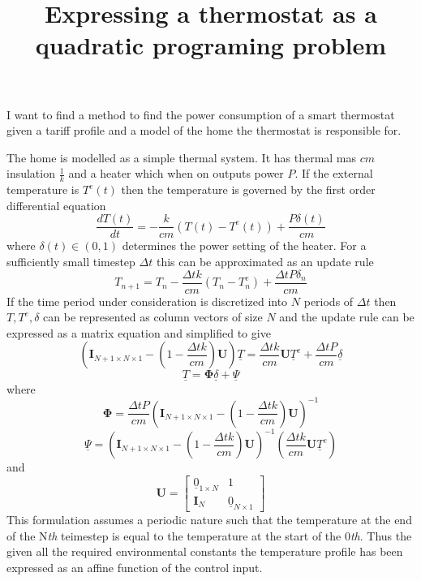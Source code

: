 \documentclass[11pt]{article}
\title{\textbf{Expressing a thermostat as a quadratic programing problem}}
\author{}
\date{}
\begin{document}
\maketitle

\section{}

I want to find a method to find the power consumption of a smart thermostat given a tariff profile and a model of the home the thermostat is responsible for.

The home is modelled as a simple thermal system. It has thermal mas $cm$ insulation $\frac{1}{k}$ and a heater which when on outputs power $P$. If the external temperature is $T^{e}(t)$ then the temperature is governed by the first order differential equation
\begin{equation}
\frac{dT(t)}{dt} = -\frac{k}{cm}(T(t)-T^{e}(t)) +\frac{P\delta(t)}{cm}
\end{equation}
where $\delta(t) \in (0,1)$ determines the power setting of the heater. For a sufficiently small timestep $\Delta t$  this can be approximated as an update rule
\begin{equation}
T_{n+1} =  T_{n}-\frac{\Delta t k}{cm}(T_{n}-T_{n}^{e}) + \frac{\Delta t P \delta_{n}}{cm} 
\end{equation}
If the time period under consideration is discretized into $N$ periods of $\Delta t$ then $T, T^{e},\delta$ can be represented as column vectors of size $N$ and the update rule can be expressed as a matrix equation and simplified to give
\begin{equation}
\left( \mathbf{I}_{N+1 \times N \times 1}-(1-\frac{\Delta t k}{cm})\mathbf{U}\right) \underline{T} = \frac{\Delta t k}{cm}\mathbf{U}\underline{T}^{e}+\frac{\Delta t P}{cm}\underline{\delta}
\end{equation}
\begin{equation}
\underline{T}=\mathbf{\Phi} \underline{\delta}+\underline{\Psi}
\end{equation}
where
\begin{equation}
\mathbf{\Phi}= \frac{\Delta t P}{cm} \left( \mathbf{I}_{N+1 \times N \times 1}-(1-\frac{\Delta t k}{cm})\mathbf{U}\right)^{-1}
\end{equation}
\begin{equation}
\underline{\Psi}= \left( \mathbf{I}_{N+1 \times N \times 1}-(1-\frac{\Delta t k}{cm})\mathbf{U}\right)^{-1} \left( \frac{\Delta t k}{cm}\mathbf{U}\underline{T}^{e}\right)
\end{equation}
and
\begin{equation}
\mathbf{U} = \left[
\begin{array}{c|c}
\underline{0}_{1\times N} & 1 \\ \hline
\mathbf{I}_{N} & \underline{0}_{N \times 1}
\end{array}\right]
\end{equation}
This formulation assumes a periodic nature such that the temperature at the end of the N\textit{th} teimestep is equal to the temperature at the start of the 0\textit{th}.
Thus the given all the required environmental constants the temperature profile has been expressed as an affine function of the control input.
\end{document}

